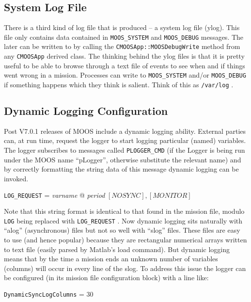 \documentclass[a4paper,10pt]{article}
\newcommand{\Code}[1]{\texttt{#1} }
\newcommand{\code}[1]{\Code{#1} }
\begin{document}
\subsection{System Log File}
There is a third kind of log file that is produced -- a system log file (ylog). This file only contains
data contained in \code{MOOS\_SYSTEM} and \code{MOOS\_DEBUG} messages. The later can be written to by calling the \code{CMOOSApp::MOOSDebugWrite} method from any \code{CMOOSApp} derived class. The thinking behind the ylog files is that it is pretty useful to be able to browse through
a text file of events to see when and if things went wrong in a mission. Processes can write to \code{MOOS\_SYSTEM} and/or \code{MOOS\_DEBUG} if something happens which they think is salient. Think of this as \code{/var/log}.


\subsection{Dynamic Logging Configuration}
Post V7.0.1 releases of MOOS include a dynamic logging ability. External parties can, at run time, request the logger to start logging
particular (named) variables. The logger subscribes to messages called \code{PLOGGER\_CMD} (if the Logger is being run under the MOOS name ``pLogger'', otherwise substitute the relevant name) and by correctly formatting the string data of this message dynamic logging can be invoked.

\begin{center}
\code{LOG\_REQUEST} =  {\it{varname}} @ {\it{period}} $[NOSYNC],[MONITOR]$
\end{center}

Note that this string format is identical to that found in the mission file, modulo \code{LOG} being replaced with \code{LOG\_REQUEST}. Now dynamic logging sits naturally with ``alog'' (asynchronous) files but not so well with ``slog'' files. These files are easy to use (and hence popular)  because they are rectangular numerical arrays written to text file (easily parsed by Matlab's load command). But dynamic logging means that by the time a mission ends an unknown number of variables (columns) will occur in every line of the slog. To address this issue the logger can be configured (in its mission file configuration block) with a line like:

\begin{center}
\code{DynamicSyncLogColumns} =  30
\end{center}
\end{document}
